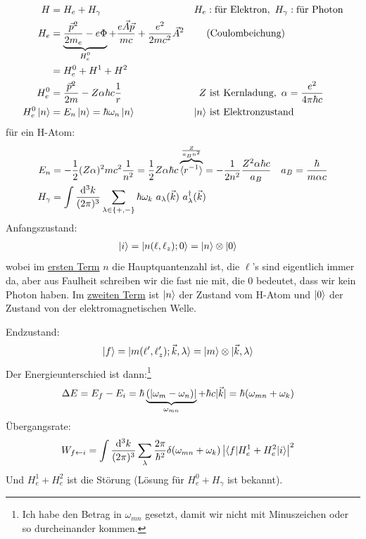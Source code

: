 		\begin{align*}
		H &= H_e + H_\gamma & H_e &: \text{für Elektron}, ~ H_\gamma : \text{für Photon} \\
		H_e &= \underbrace{\frac{\vec{p}^2}{2 m_e} - e \Phi}_{\mathclap{H_e^0}}
		+ \frac{e \vec{A} \vec{p}}{m c}
		+ \frac{e^2}{2 m c^2} \vec{A}^2 &
		&\text{(Coulombeichung)}\\
		&= H_e^0 + H^1 + H^2 \\
		H_e^0 &= \frac{\vec{p}^2}{2 m} - Z \alpha \hbar c \frac{1}{r} & 
		Z &~\text{ist Kernladung},~ \alpha = \frac{e^2}{4 \pi \hbar c}\\
		H_e^0 \ket{n} &= E_n \ket{n} = \hbar \omega_n \ket{n} & 
		\ket{n} &~ \text{ist Elektronzustand}
		\end{align*}	
		für ein H-Atom:
		\begin{align*}
		E_n &= - \frac{1}{2} (Z \alpha)^2 m c^2 \frac{1}{n^2}
		= \frac{1}{2} Z \alpha \hbar c \overbrace{\erw{r^{-1}}}^{\mathclap{\frac{Z}{a_B n^2}}}
		= - \frac{1}{2 n^2} \frac{Z^2 \alpha \hbar c}{a_B} &
		a_B &= \frac{\hbar}{m \alpha c} \\
		H_\gamma &= \int \frac{\diff^3 k}{(2 \pi)^3}
		\sum_{\lambda \in \{+,-\}} \hbar \omega_k
		~a_\lambda (\vec{k})~a^\dagger_\lambda (\vec{k})
		\end{align*}
		Anfangszustand: 
		\begin{align*}
		\ket{i} &= \ket{n(\ell, \ell_z); 0} = \ket{n} \otimes \ket{0}
		\end{align*}
		wobei im \underline{ersten Term} $n$ die Hauptquantenzahl ist, die $\ell$'s sind eigentlich immer da, aber aus Faulheit schreiben wir die fast nie mit, die $0$ bedeutet, dass wir kein Photon haben. Im \underline{zweiten Term} ist $\ket{n}$ der Zustand vom H-Atom und $\ket{0}$ der Zustand von der elektromagnetischen Welle.
		
		Endzustand:
		\begin{align*}
		\ket{f} &= \ket{m(\ell', \ell_z'); \vec{k}, \lambda} 
		= \ket{m} \otimes \ket{\vec{k}, \lambda}
		\end{align*} 
		Der Energieunterschied ist dann:\footnote{Ich habe den Betrag in $\omega_{mn}$ gesetzt, damit wir nicht mit Minuszeichen oder so durcheinander kommen.}
		\begin{align*}
		\Delta E &= E_f - E_i = \hbar 
		\underbrace{(|\omega_m - \omega_n)|}_{\mathclap{\omega_{mn}}} 
		+ \hbar c |\vec{k}| = \hbar (\omega_{mn} + \omega_k)
		\end{align*}
		Übergangsrate: 
		\begin{align*}
		W_{f \leftarrow i} &= 
		\int \frac{\mathrm{d}^3 k}{(2 \pi)^3} \sum_\lambda
		\frac{2 \pi}{\hbar^2} \delta(\omega_{mn} + \omega_k)
		\left|\braket{f | H_e^1 + H_e^2 | i}\right|^2
		\end{align*}	
		Und $H_e^1 + H_e^2$ ist die Störung (Lösung für $H_e^0 + H_\gamma$ ist bekannt).
		
